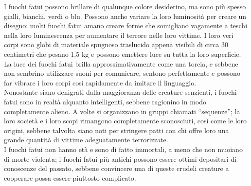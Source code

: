 \begin{multicols}{2}
I fuochi fatui possono brillare di qualunque colore desiderino, ma sono più spesso gialli, bianchi, verdi o blu. Possono anche variare la loro luminosità per creare un disegno: molti fuochi fatui amano creare forme che somigliano vagamente a teschi nella loro luminescenza per aumentare il terrore nelle loro vittime. I loro veri corpi sono globi di materiale spugnoso traslucido appena visibili di circa 30 centimetri che pesano 1,5 kg e possono emettere luce su tutta la loro superficie. La luce dei fuochi fatui brilla approssimativamente come una torcia, e sebbene non sembrino utilizzare suoni per comunicare, sentono perfettamente e possono far vibrare i loro corpi così rapidamente da imitare il linguaggio.\\

Nonostante siano denigrati dalla maggioranza delle creature senzienti, i fuochi fatui sono in realtà alquanto intelligenti, sebbene ragionino in modo completamente alieno. A volte si organizzano in gruppi chiamati “sequenze”; la loro società e i loro scopi rimangono completamente sconosciuti, così come le loro origini, sebbene talvolta siano noti per stringere patti con chi offre loro una grande quantità di vittime adeguatamente terrorizzate.\\

I fuochi fatui non hanno età e sono di fatto immortali, a meno che non muoiano di morte violenta; i fuochi fatui più antichi possono essere ottimi depositari di conoscenze del passato, sebbene convincere una di queste crudeli creature a cooperare possa essere piuttosto complicato.\\


\end{multicols}

